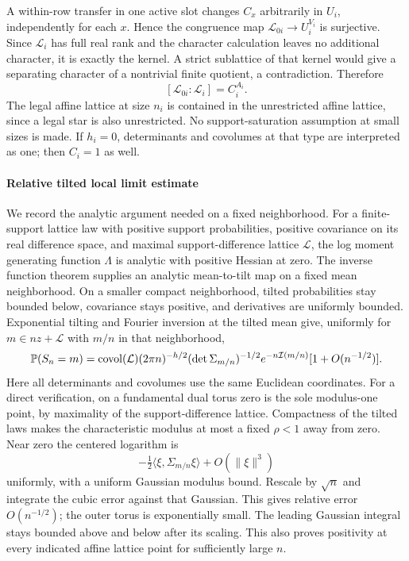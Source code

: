 A within-row transfer in one active slot changes $C_x$ arbitrarily in $U_i$, independently for each $x$. Hence the congruence map $\mathcal L_{0i}\to U_i^{V_i}$ is surjective. Since $\mathcal L_i$ has full real rank and the character calculation leaves no additional character, it is exactly the kernel. A strict sublattice of that kernel would give a separating character of a nontrivial finite quotient, a contradiction. Therefore
\begin{equation}\label{ch:eq:localindex}
 [\mathcal L_{0i}:\mathcal L_i]=C_i^{A_i}.
\end{equation}
The legal affine lattice at size $n_i$ is contained in the unrestricted affine lattice, since a legal star is also unrestricted. No support-saturation assumption at small sizes is made. If $h_i=0$, determinants and covolumes at that type are interpreted as one; then $C_i=1$ as well.

\paragraph{Relative tilted local limit estimate}
We record the analytic argument needed on a fixed neighborhood. For a finite-support lattice law with positive support probabilities, positive covariance on its real difference space, and maximal support-difference lattice $\mathcal L$, the log moment generating function $\Lambda$ is analytic with positive Hessian at zero. The inverse function theorem supplies an analytic mean-to-tilt map on a fixed mean neighborhood. On a smaller compact neighborhood, tilted probabilities stay bounded below, covariance stays positive, and derivatives are uniformly bounded. Exponential tilting and Fourier inversion at the tilted mean give, uniformly for $m\in nz+\mathcal L$ with $m/n$ in that neighborhood,
\begin{equation}\label{ch:eq:llt}
 \mathbb P(S_n=m)=\operatorname{covol}(\mathcal L)(2\pi n)^{-h/2}
 (\det\Sigma_{m/n})^{-1/2}e^{-n\mathcal I(m/n)}
 [1+O(n^{-1/2})].
\end{equation}
Here all determinants and covolumes use the same Euclidean coordinates. For a direct verification, on a fundamental dual torus zero is the sole modulus-one point, by maximality of the support-difference lattice. Compactness of the tilted laws makes the characteristic modulus at most a fixed $\rho<1$ away from zero. Near zero the centered logarithm is
\[
 -\tfrac12\langle\xi,\Sigma_{m/n}\xi\rangle+O(\|\xi\|^3)
\]
uniformly, with a uniform Gaussian modulus bound. Rescale by $\sqrt n$ and integrate the cubic error against that Gaussian. This gives relative error $O(n^{-1/2})$; the outer torus is exponentially small. The leading Gaussian integral stays bounded above and below after its scaling. This also proves positivity at every indicated affine lattice point for sufficiently large $n$.

